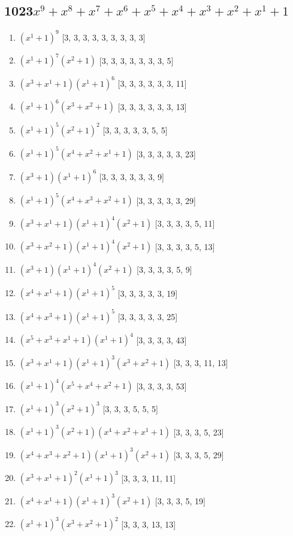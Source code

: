 \documentclass[10pt,twocolumn]{article}
\begin{document}
\subsection*{1023$x^{9} + x^{8} + x^{7} + x^{6} + x^{5} + x^{4} + x^{3} + x^{2} + x^{1} + 1$  } 
\begin{enumerate}
\item $(x^{1} + 1)^{9}$  [3, 3, 3, 3, 3, 3, 3, 3, 3]
\item $(x^{1} + 1)^{7}(x^{2} + 1)$  [3, 3, 3, 3, 3, 3, 3, 5]
\item $(x^{3} + x^{1} + 1)(x^{1} + 1)^{6}$  [3, 3, 3, 3, 3, 3, 11]
\item $(x^{1} + 1)^{6}(x^{3} + x^{2} + 1)$  [3, 3, 3, 3, 3, 3, 13]
\item $(x^{1} + 1)^{5}(x^{2} + 1)^{2}$  [3, 3, 3, 3, 3, 5, 5]
\item $(x^{1} + 1)^{5}(x^{4} + x^{2} + x^{1} + 1)$  [3, 3, 3, 3, 3, 23]
\item $(x^{3} + 1)(x^{1} + 1)^{6}$  [3, 3, 3, 3, 3, 3, 9]
\item $(x^{1} + 1)^{5}(x^{4} + x^{3} + x^{2} + 1)$  [3, 3, 3, 3, 3, 29]
\item $(x^{3} + x^{1} + 1)(x^{1} + 1)^{4}(x^{2} + 1)$  [3, 3, 3, 3, 5, 11]
\item $(x^{3} + x^{2} + 1)(x^{1} + 1)^{4}(x^{2} + 1)$  [3, 3, 3, 3, 5, 13]
\item $(x^{3} + 1)(x^{1} + 1)^{4}(x^{2} + 1)$  [3, 3, 3, 3, 5, 9]
\item $(x^{4} + x^{1} + 1)(x^{1} + 1)^{5}$  [3, 3, 3, 3, 3, 19]
\item $(x^{4} + x^{3} + 1)(x^{1} + 1)^{5}$  [3, 3, 3, 3, 3, 25]
\item $(x^{5} + x^{3} + x^{1} + 1)(x^{1} + 1)^{4}$  [3, 3, 3, 3, 43]
\item $(x^{3} + x^{1} + 1)(x^{1} + 1)^{3}(x^{3} + x^{2} + 1)$  [3, 3, 3, 11, 13]
\item $(x^{1} + 1)^{4}(x^{5} + x^{4} + x^{2} + 1)$  [3, 3, 3, 3, 53]
\item $(x^{1} + 1)^{3}(x^{2} + 1)^{3}$  [3, 3, 3, 5, 5, 5]
\item $(x^{1} + 1)^{3}(x^{2} + 1)(x^{4} + x^{2} + x^{1} + 1)$  [3, 3, 3, 5, 23]
\item $(x^{4} + x^{3} + x^{2} + 1)(x^{1} + 1)^{3}(x^{2} + 1)$  [3, 3, 3, 5, 29]
\item $(x^{3} + x^{1} + 1)^{2}(x^{1} + 1)^{3}$  [3, 3, 3, 11, 11]
\item $(x^{4} + x^{1} + 1)(x^{1} + 1)^{3}(x^{2} + 1)$  [3, 3, 3, 5, 19]
\item $(x^{1} + 1)^{3}(x^{3} + x^{2} + 1)^{2}$  [3, 3, 3, 13, 13]

\end{enumerate}
\end{document}
